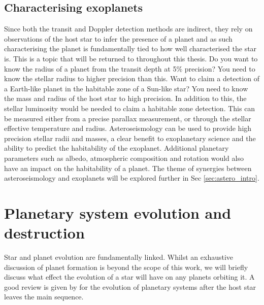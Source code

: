 \subsection{Characterising exoplanets}
Since both the transit and Doppler detection methods are indirect, they rely on observations of the host star to infer the presence of a planet and as such characterising the planet is fundamentally tied to how well characterised the star is. This is a topic that will be returned to throughout this thesis. Do you want to know the radius of a planet from the transit depth at 5\% precision? You need to know the stellar radius to higher precision than this. Want to claim a detection of a Earth-like planet in the habitable zone of a Sun-like star? You need to know the mass and radius of the host star to high precision. In addition to this, the stellar luminosity would be needed to claim a habitable zone detection. This can be measured either from a precise parallax measurement, or through the stellar effective temperature and radius. Asteroseismology can be used to provide high precision stellar radii and masses, a clear benefit to exoplanetary science and the ability to predict the habitability of the exoplanet. Additional planetary parameters such as albedo, atmospheric composition and rotation would also have an impact on the habitability of a planet. The theme of synergies between asteroseismology and exoplanets will be explored further in Sec \ref{sec:astero_intro}.

\section{Planetary system evolution and destruction}
Star and planet evolution are fundamentally linked. Whilst an exhaustive discussion of planet formation is beyond the scope of this work, we will briefly discuss what effect the evolution of a star will have on any planets orbiting it. A good review is given by \cite{2016Veras} for the evolution of planetary systems after the host star leaves the main sequence. 

